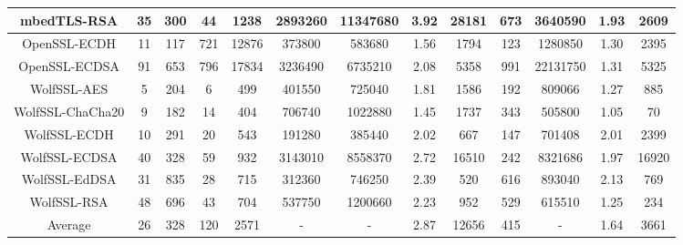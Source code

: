 \begin{table*}[!htbp]
{\begin{tabular}{ccccc|cccc|cccc}
    mbedTLS-RSA &35 &300 &44 &1238 & 2893260 &11347680 &3.92 & 28181 & 673 &3640590	&1.93	&2609 \\
\hline
    OpenSSL-ECDH &11 &117 &721 &12876 & 373800 &583680 &1.56 & 1794 & 123 &1280850	&1.30	&2395 \\
    OpenSSL-ECDSA &91 &653 &796 &17834 & 3236490 &6735210 &2.08 & 5358 & 991 &22131750	&1.31	&5325 \\
\hline
    WolfSSL-AES &5 &204 &6 &499 & 401550 &725040 &1.81 & 1586 & 192 &809066	&1.27	&885 \\
    WolfSSL-ChaCha20 &9 &182 &14 &404 & 706740 &1022880 &1.45 & 1737 & 343 &505800	&1.05	&70 \\
    WolfSSL-ECDH &10 &291 &20 &543 & 191280 &385440 &2.02 & 667 & 147 &701408	&2.01	&2399 \\
    WolfSSL-ECDSA &40 &328 &59 &932 & 3143010 &8558370 &2.72 & 16510 & 242 &8321686	&1.97	&16920 \\
    WolfSSL-EdDSA &31 &835 &28 &715 & 312360 &746250 &2.39 & 520 & 616 &893040	&2.13	&769 \\
    WolfSSL-RSA &48 &696 &43 &704 & 537750 &1200660 &2.23 & 952 & 529 &615510	&1.25	&234 \\
\hline
    Average &26 &328 &120 &2571 & - &- &2.87 &12656 & 415 &-	&1.64	&3661 \\
\hline
\end{tabular}}
\end{table*}

